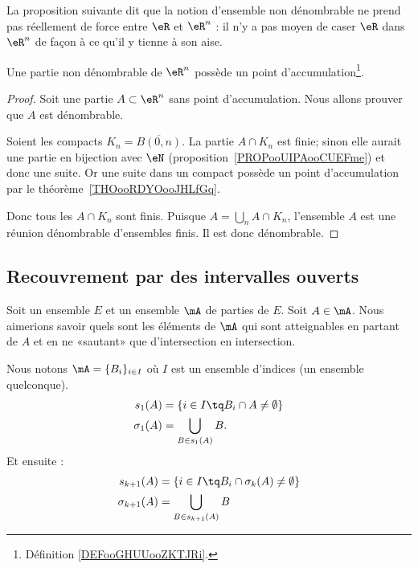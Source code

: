 La proposition suivante dit que la notion d'ensemble non dénombrable ne prend pas réellement de force entre \( \eR\) et \( \eR^n\) : il n'y a pas moyen de caser \( \eR\) dans \( \eR^n\) de façon à ce qu'il y tienne à son aise.

\begin{proposition}
	Une partie non dénombrable de \( \eR^n\) possède un point d'accumulation\footnote{Définition \ref{DEFooGHUUooZKTJRi}.}.
\end{proposition}

\begin{proof}
	Soit une partie \( A\subset \eR^n\) sans point d'accumulation. Nous allons prouver que \( A\) est dénombrable.

	Soient les compacts \( K_n=\overline{ B(0,n) }\). La partie \( A\cap K_n\) est finie; sinon elle aurait une partie en bijection avec \( \eN\) (proposition~\ref{PROPooUIPAooCUEFme}) et donc une suite. Or une suite dans un compact possède un point d'accumulation par le théorème~\ref{THOooRDYOooJHLfGq}.

	Donc tous les \( A\cap K_n\) sont finis. Puisque \( A=\bigcup_nA\cap K_n\), l'ensemble \( A\) est une réunion dénombrable d'ensembles finis. Il est donc dénombrable.
\end{proof}

\subsection{Recouvrement par des intervalles ouverts}

Soit un ensemble \( E\) et un ensemble \( \mA\) de parties de \( E\). Soit \( A\in \mA\). Nous aimerions savoir quels sont les éléments de \( \mA\) qui sont atteignables en partant de \( A\) et en ne «sautant» que d'intersection en intersection.

Nous notons \( \mA=\{ B_i \}_{i\in I}\) où \( I\) est un ensemble d'indices (un ensemble quelconque).
\begin{subequations}
	\begin{align}
		s_1(A)      & =\{  i\in I\tq B_i\cap A\neq \emptyset   \} \\
		\sigma_1(A) & =\bigcup_{B\in s_1(A)}B.
	\end{align}
\end{subequations}
Et ensuite :
\begin{subequations}
	\begin{align}
		s_{k+1}(A)      & =\{ i\in I\tq B_i\cap \sigma_k(A)\neq \emptyset \} \\
		\sigma_{k+1}(A) & =\bigcup_{B\in s_{k+1}(A)}B
	\end{align}
\end{subequations}

